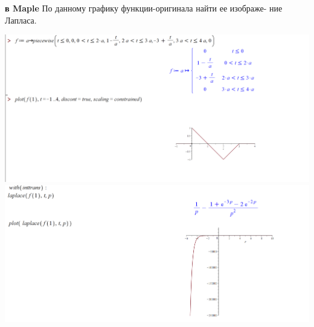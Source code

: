 {  \textbf{в Maple}
  По данному графику функции-оригинала найти ее изображе-
  ние Лапласа.
  \begin{center}
    \includegraphics[width=1.0\textwidth]{practice(4_1).png} 
    \includegraphics[width=1.0\textwidth]{practice(4_2).png} 
    \end{center}
}
